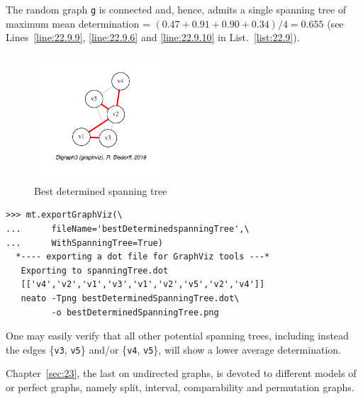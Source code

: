 The random graph \texttt{g} is connected and, hence, admits a single spanning tree of maximum mean determination = $(0.47 + 0.91 + 0.90 + 0.34)/4 = 0.655$ (see Lines~\ref{line:22.9.9}, \ref{line:22.9.6} and \ref{line:22.9.10} in List.~\vref{list:22.9}).
\begin{figure}[ht]
\sidecaption[t]
\includegraphics[width=5cm]{Figures/22-7-bestDeterminedSpanningTree.pdf}
\caption{Best determined spanning tree} 
\label{fig:22.7}       %
\end{figure}
\begin{lstlisting}
>>> mt.exportGraphViz(\
...      fileName='bestDeterminedspanningTree',\
...      WithSpanningTree=True)
  *---- exporting a dot file for GraphViz tools ---*
   Exporting to spanningTree.dot
   [['v4','v2','v1','v3','v1','v2','v5','v2','v4']]
   neato -Tpng bestDeterminedSpanningTree.dot\
         -o bestDeterminedSpanningTree.png
\end{lstlisting}

One may easily verify that all other potential spanning trees, including instead the edges \{\texttt{v3}, \texttt{v5}\} and/or \{\texttt{v4}, \texttt{v5}\}, will show a lower average determination.

\vspace{\baselineskip}

Chapter~\ref{sec:23}, the last on undirected graphs, is devoted to different models of \Berge or perfect graphs, namely split, interval, comparability and permutation graphs. 
 

%
%
